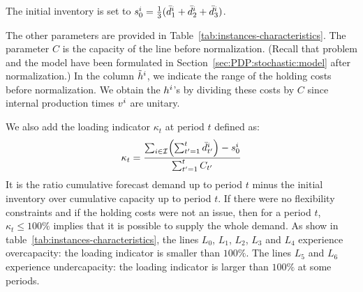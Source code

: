 The initial inventory is set to $s_0^i=\frac{1}{3}(\bar{d}_1^i+\bar{d}_2^i+\bar{d}_3^i)$.

The other parameters are provided in Table~\ref{tab:instances-characteristics}.
The parameter $C$ is the capacity of the line before normalization. (Recall that problem and the model have been formulated in Section~\ref{sec:PDP:stochastic:model} after normalization.)
In the column $\tilde{h}^i$, we indicate the range of the holding costs before normalization. We obtain the $h^i$'s by dividing these costs by $C$ since internal production times $v^i$ are unitary.

We also add the loading indicator $\kappa_t$ at period $t$ defined as:
\begin{equation}
  \kappa_t = \frac{\sum_{i\in\REF} \bracket{\sum_{t'=1}^{t} \bar{\demand}_{t'}^i}-\inventory_0^i}{ \sum_{t'=1}^{t} \capacity_{t'}}
\end{equation}
It is the ratio cumulative forecast demand up to period $t$ minus the initial inventory over cumulative capacity up to period $t$. If there were no flexibility constraints and if the holding costs were not an issue, then for a period $t$, $\kappa_t \le 100\%$ implies that it is possible to supply the whole demand. As show in table~\ref{tab:instances-characteristics}, the lines $L_0$, $L_1$, $L_2$, $L_3$ and $L_4$ experience overcapacity: the loading indicator is smaller than $100\%$. The lines $L_5$ and $L_6$ experience undercapacity: the loading indicator is larger than $100\%$ at some periods.


